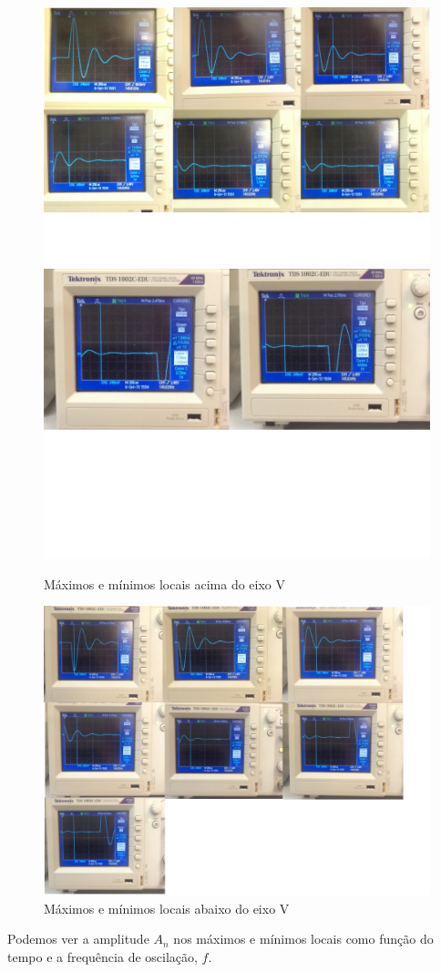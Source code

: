 \documentclass[12pt,letterpaper]{article}
\begin{document}
\begin{figure}[!htb]
  \centering
  \label{tabela}
  \includegraphics[scale=0.20]{img/a1v.png}
  \includegraphics[scale=0.38]{img/a2v.png}
  \caption{Máximos e mínimos locais acima do eixo V}
\end{figure}
\begin{figure}[!htb]
  \centering
  \label{tabela}
  \includegraphics[scale=0.20]{img/abixo.png}
  \caption{Máximos e mínimos locais abaixo do eixo V}
\end{figure}
Podemos ver a amplitude $A_n$ nos máximos e mínimos locais como função do tempo e a frequência de oscilação, $f$.
\end{document}
